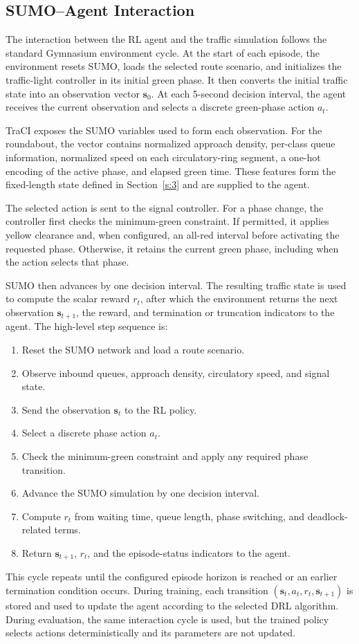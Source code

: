 \subsection{SUMO--Agent Interaction}
The interaction between the RL agent and the traffic simulation follows the standard Gymnasium environment cycle. At the start of each episode, the environment resets SUMO, loads the selected route scenario, and initializes the traffic-light controller in its initial green phase. It then converts the initial traffic state into an observation vector $\mathbf{s}_0$. At each 5-second decision interval, the agent receives the current observation and selects a discrete green-phase action $a_t$.

TraCI exposes the SUMO variables used to form each observation. For the roundabout, the vector contains normalized approach density, per-class queue information, normalized speed on each circulatory-ring segment, a one-hot encoding of the active phase, and elapsed green time. These features form the fixed-length state defined in Section~\ref{s:3} and are supplied to the agent.

The selected action is sent to the signal controller. For a phase change, the controller first checks the minimum-green constraint. If permitted, it applies yellow clearance and, when configured, an all-red interval before activating the requested phase. Otherwise, it retains the current green phase, including when the action selects that phase.

SUMO then advances by one decision interval. The resulting traffic state is used to compute the scalar reward $r_t$, after which the environment returns the next observation $\mathbf{s}_{t+1}$, the reward, and termination or truncation indicators to the agent. The high-level step sequence is:
\begin{enumerate}
\item Reset the SUMO network and load a route scenario.
\item Observe inbound queues, approach density, circulatory speed, and signal state.
\item Send the observation $\mathbf{s}_t$ to the RL policy.
\item Select a discrete phase action $a_t$.
\item Check the minimum-green constraint and apply any required phase transition.
\item Advance the SUMO simulation by one decision interval.
\item Compute $r_t$ from waiting time, queue length, phase switching, and deadlock-related terms.
\item Return $\mathbf{s}_{t+1}$, $r_t$, and the episode-status indicators to the agent.
\end{enumerate}
This cycle repeats until the configured episode horizon is reached or an earlier termination condition occurs. During training, each transition $(\mathbf{s}_t,a_t,r_t,\mathbf{s}_{t+1})$ is stored and used to update the agent according to the selected DRL algorithm. During evaluation, the same interaction cycle is used, but the trained policy selects actions deterministically and its parameters are not updated.
